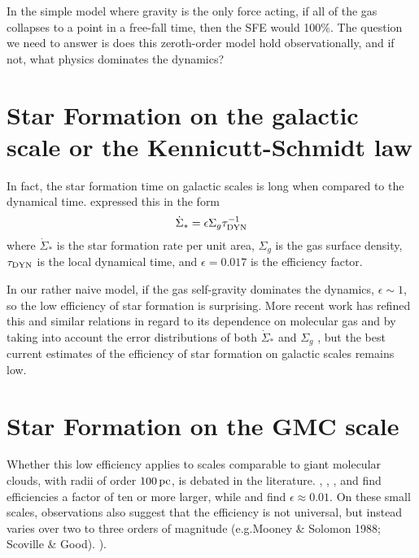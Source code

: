 \documentclass[../dissertation.tex]{subfiles}
\begin{document}
In the simple model where gravity is the only force acting, if all of the gas collapses to a point in a free-fall time, then the SFE would 100\%.
The question we need to answer is does this zeroth-order model hold observationally, and if not, what physics dominates the dynamics?

\section{Star Formation on the galactic scale or the Kennicutt-Schmidt law}
In fact, the star formation time on galactic scales is long when compared to the dynamical time. 
\citet{1998ApJ...498..541K} expressed this in the form
%
\begin{equation}\label{eq:intro_KS_law}
\dot{\Sigma}_* = \epsilon\Sigma_g \tau_{\rm DYN}^{-1}
\end{equation}
%
where $\dot{\Sigma}_*$ is the star formation rate per unit area, $\Sigma_g$ is the 
gas surface density, $\tau_{\rm DYN}$ is the local dynamical time, and $\epsilon = 0.017$ 
is the efficiency factor.  

In our rather naive model, if the gas self-gravity dominates the dynamics, $\epsilon \sim 1$, so the low efficiency of star formation is surprising. 
More recent work has refined this and similar relations in regard to its dependence on molecular gas \citep{2008AJ....136.2846B} and by taking into account the error distributions of both $\dot\Sigma_*$ and $\Sigma_g$ \citep{2013MNRAS.430..288S}, but the best current estimates of the efficiency of star formation on galactic scales remains low. 

\section{Star Formation on the GMC scale}
Whether this low efficiency applies to scales comparable to giant molecular clouds, with radii of
order $100\,\rm pc$, is debated in the literature.
\citet{2010ApJ...723.1019H}, \citet{2010ApJ...724..687L}, \citet{2010ApJS..188..313W}, and \citet{2011ApJ...729..133M} 
find efficiencies a factor of ten or more larger, while \citet{2007ApJ...654..304K} and \citet{2012ApJ...745...69K} 
find $\epsilon\approx0.01$.
On these small scales, observations also suggest that the efficiency is not universal, but instead 
varies over two to three orders of magnitude (e.g.Mooney \& Solomon 1988; Scoville \& Good).  
\citealt{1988ApJ...334L..51M,2016ApJ...833..229L}).%
\end{document}
